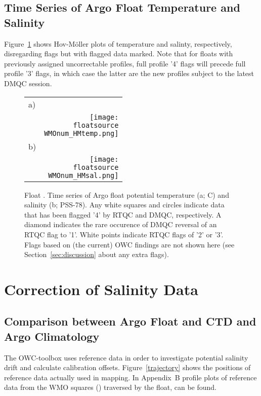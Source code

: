 \documentclass{article}
\begin{document}
\subsection{Time Series of Argo Float Temperature and Salinity}
%
Figure~\ref{fig:hovmoller} shows Hov-M{\"o}ller plots of temperature and
salinty, respectively, disregarding flags but with flagged data marked.
%
Note that for floats with previously assigned uncorrectable profiles, full
profile '4' flags will precede full profile '3' flags, in which case the
latter are the new profiles subject to the latest DMQC session.
%
\begin{figure}[H]
  \centering
  \begin{tabular}{lr}
  a) & \\
  &\texttt{[image: \\floatsource\\WMOnum\_HMtemp.png]}\\
  b)& \\
  &\texttt{[image: \\floatsource\\WMOnum\_HMsal.png]}
  \end{tabular}
  \caption{Float \WMOnum. Time series of Argo float potential temperature
    (a; \textdegree C) and salinity (b; PSS-78). Any white squares and
  circles indicate data that has been flagged '4' by RTQC and DMQC, respectively. 
  A diamond indicates the rare occurence of DMQC reversal of an RTQC flag to '1'.
  White points indicate RTQC flags of '2' or '3'. 
  Flags based on (the current) OWC findings are not shown here (see Section~\ref{sec:discussion} about any extra flags).}
\label{fig:hovmoller}
\end{figure}



\newpage
\section{Correction of Salinity Data}\label{sec:OWC}
%

\subsection{Comparison between Argo Float and CTD and Argo Climatology} 
%
The OWC-toolbox uses reference data in order to investigate potential
salinity drift and calculate calibration offsets. Figure~\ref{trajectory}
shows the positions of reference data actually used in mapping. In 
Appendix~B profile plots of reference data from the WMO squares
() traversed by the float, can be found.
\end{document}
